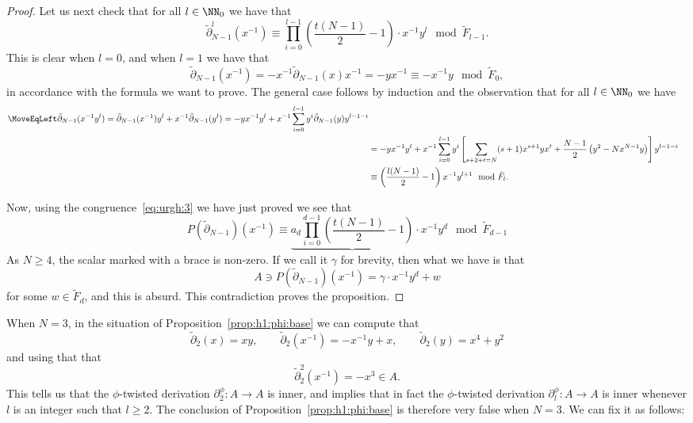 \begin{proof}
Let us next check that for all $l\in\NN_0$ we have that
  \[ \label{eq:urgh:3}
  \tilde\partial_{N-1}^l(x^{-1})
        \equiv \prod_{i=0}^{l-1}\left(\frac{t(N-1)}{2}-1\right)\cdot x^{-1}y^{l} 
        \mod \tilde F_{l-1}.
  \]
This is clear when $l=0$, and when $l=1$ we have that
  \[
  \tilde\partial_{N-1}(x^{-1})
        = -x^{-1}\tilde\partial_{N-1}(x)x^{-1}
        = -yx^{-1}
        \equiv -x^{-1}y\mod \tilde F_0,
  \]
in accordance with the formula we want to prove. The general case follows
by induction and the observation that for all $l\in\NN_0$ we have
  \begin{align}
  \MoveEqLeft
  \tilde\partial_{N-1}(x^{-1}y^l)
        = \tilde\partial_{N-1}(x^{-1})y^l + x^{-1}\tilde\partial_{N-1}(y^l) 
        = -yx^{-1}y^l + x^{-1}\sum_{i=0}^{l-1}y^i\tilde\partial_{N-1}(y)y^{l-1-i} \\
       &= -yx^{-1}y^l + x^{-1}\sum_{i=0}^{l-1}y^i
                \left[
                \sum_{s+2+t=N}(s+1)x^{s+1}yx^t 
                         +  \frac{N-1}{2}
                            \left(
                              y^{2}
                              -N
                              x^{N-1}y
                            \right)
               \right]
               y^{l-1-i}
          \\
       &\equiv \left(\frac{l(N-1)}{2}-1\right)
                x^{-1}
               y^{l+1} \mod \tilde F_l.
  \end{align}

Now, using the congruence~\eqref{eq:urgh:3} we have just proved we see that
  \[
  P(\tilde\partial_{N-1})(x^{-1})
    \equiv \underbrace{a_d \prod_{i=0}^{d-1}\left(\frac{t(N-1)}{2}-1\right)}
        {}\cdot x^{-1}y^{d} 
    \mod \tilde F_{d-1}
  \]
As $N\geq4$, the scalar marked with a brace is non-zero. If we call it
$\gamma$ for brevity, then what we have is that 
  \[
  A \ni P(\tilde\partial_{N-1})(x^{-1}) = \gamma\cdot x^{-1}y^d + w
  \]
for some $w\in\tilde F_d$, and this is absurd. This contradiction proves
the proposition.
\end{proof}

When $N=3$, in the situation of Proposition~\ref{prop:h1:phi:base} we can
compute that 
  \[
  \tilde\partial_2(x)=xy, 
  \qquad
  \tilde\partial_2(x^{-1})=-x^{-1}y+x,
  \qquad
  \tilde\partial_2(y)=x^4+y^2
  \]
and using that that
  \[
  \tilde\partial_2^2(x^{-1}) = -x^3 \in A.
  \]
This tells us that the $\phi$-twisted derivation $\partial^\phi_2:A\to A$
is inner, and implies that in fact the $\phi$-twisted derivation
$\partial^\phi_l:A\to A$ is inner whenever $l$ is an integer such that
$l\geq2$. The conclusion of Proposition~\ref{prop:h1:phi:base} is therefore
very false when $N=3$. We can fix it as follows:

